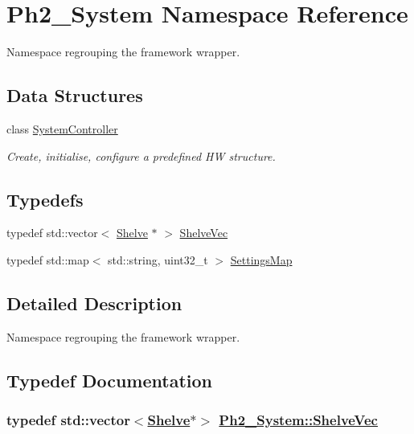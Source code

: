 \hypertarget{namespace_ph2___system}{
\section{Ph2\_\-System Namespace Reference}
\label{namespace_ph2___system}
}
Namespace regrouping the framework wrapper.  


\subsection*{Data Structures}
\begin{CompactItemize}
\item 
class \hyperlink{class_ph2___system_1_1_system_controller}{System\-Controller}
\begin{CompactList}\small\item\em Create, initialise, configure a predefined HW structure. \item\end{CompactList}\end{CompactItemize}
\subsection*{Typedefs}
\begin{CompactItemize}
\item 
typedef std::vector$<$ \hyperlink{class_ph2___hw_description_1_1_shelve}{Shelve} $\ast$ $>$ \hyperlink{namespace_ph2___system_1c21eed494ab8a888694adf3de379dcf}{Shelve\-Vec}
\item 
typedef std::map$<$ std::string, uint32\_\-t $>$ \hyperlink{namespace_ph2___system_f2bca61b7444e1e35ab6bccba079876b}{Settings\-Map}
\end{CompactItemize}


\subsection{Detailed Description}
Namespace regrouping the framework wrapper. 

\subsection{Typedef Documentation}
\hypertarget{namespace_ph2___system_1c21eed494ab8a888694adf3de379dcf}{
\subsubsection[ShelveVec]{\setlength{\rightskip}{0pt plus 5cm}typedef std::vector$<$\hyperlink{class_ph2___hw_description_1_1_shelve}{Shelve}$\ast$$>$ \hyperlink{namespace_ph2___system_1c21eed494ab8a888694adf3de379dcf}{Ph2\_\-System::Shelve\-Vec}}}
\label{namespace_ph2___system_1c21eed494ab8a888694adf3de379dcf}


